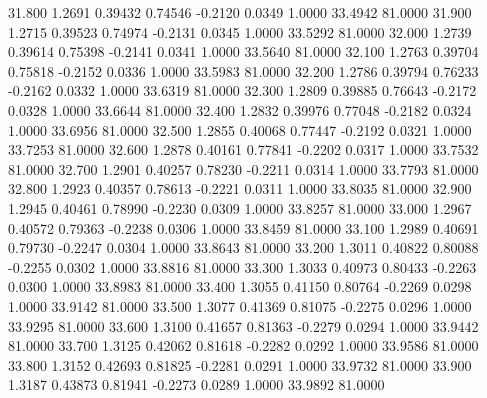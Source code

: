   31.800   1.2691   0.39432   0.74546  -0.2120   0.0349   1.0000  33.4942  81.0000
  31.900   1.2715   0.39523   0.74974  -0.2131   0.0345   1.0000  33.5292  81.0000
  32.000   1.2739   0.39614   0.75398  -0.2141   0.0341   1.0000  33.5640  81.0000
  32.100   1.2763   0.39704   0.75818  -0.2152   0.0336   1.0000  33.5983  81.0000
  32.200   1.2786   0.39794   0.76233  -0.2162   0.0332   1.0000  33.6319  81.0000
  32.300   1.2809   0.39885   0.76643  -0.2172   0.0328   1.0000  33.6644  81.0000
  32.400   1.2832   0.39976   0.77048  -0.2182   0.0324   1.0000  33.6956  81.0000
  32.500   1.2855   0.40068   0.77447  -0.2192   0.0321   1.0000  33.7253  81.0000
  32.600   1.2878   0.40161   0.77841  -0.2202   0.0317   1.0000  33.7532  81.0000
  32.700   1.2901   0.40257   0.78230  -0.2211   0.0314   1.0000  33.7793  81.0000
  32.800   1.2923   0.40357   0.78613  -0.2221   0.0311   1.0000  33.8035  81.0000
  32.900   1.2945   0.40461   0.78990  -0.2230   0.0309   1.0000  33.8257  81.0000
  33.000   1.2967   0.40572   0.79363  -0.2238   0.0306   1.0000  33.8459  81.0000
  33.100   1.2989   0.40691   0.79730  -0.2247   0.0304   1.0000  33.8643  81.0000
  33.200   1.3011   0.40822   0.80088  -0.2255   0.0302   1.0000  33.8816  81.0000
  33.300   1.3033   0.40973   0.80433  -0.2263   0.0300   1.0000  33.8983  81.0000
  33.400   1.3055   0.41150   0.80764  -0.2269   0.0298   1.0000  33.9142  81.0000
  33.500   1.3077   0.41369   0.81075  -0.2275   0.0296   1.0000  33.9295  81.0000
  33.600   1.3100   0.41657   0.81363  -0.2279   0.0294   1.0000  33.9442  81.0000
  33.700   1.3125   0.42062   0.81618  -0.2282   0.0292   1.0000  33.9586  81.0000
  33.800   1.3152   0.42693   0.81825  -0.2281   0.0291   1.0000  33.9732  81.0000
  33.900   1.3187   0.43873   0.81941  -0.2273   0.0289   1.0000  33.9892  81.0000
